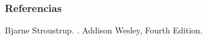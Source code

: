 \begin{frame}[allowframebreaks]
   \frametitle<presentation>{Referencias}

   \begin{thebibliography}{10}

         \beamertemplatebookbibitems

         Bjarne Stroustrup.
         .
         \newblock Addison Wesley, Fourth Edition.

   \end{thebibliography}
\end{frame}




